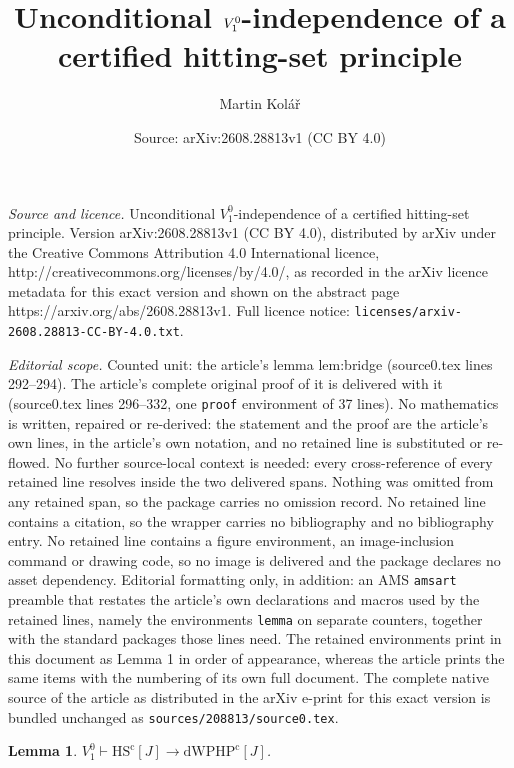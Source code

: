 \documentclass[10pt,a4paper]{amsart}
\title{Unconditional $\Vone$-independence of a certified hitting-set principle}
\author{Martin Kolář}
\date{Source: arXiv:2608.28813v1 (CC BY 4.0)}
\newtheorem{lemma}{Lemma}
\newcommand{\HScert}{\mathrm{HS}^{\mathrm{c}}}
\newcommand{\Vone}{V^0_1}
\newcommand{\dWPHPcert}{\mathrm{dWPHP}^{\mathrm{c}}}
\begin{document}
\maketitle

\noindent\emph{Source and licence.} Unconditional $\Vone$-independence of a certified hitting-set principle. Version arXiv:2608.28813v1 (CC BY 4.0), distributed by arXiv under the Creative Commons Attribution 4.0 International licence, http://creativecommons.org/licenses/by/4.0/, as recorded in the arXiv licence metadata for this exact version and shown on the abstract page https://arxiv.org/abs/2608.28813v1. Full licence notice: \texttt{licenses/arxiv-2608.28813-CC-BY-4.0.txt}.\par\smallskip

\noindent\textit{Editorial scope.} Counted unit: the article's lemma lem:bridge (source0.tex lines 292--294). The article's complete original proof of it is delivered with it (source0.tex lines 296--332, one \texttt{proof} environment of 37 lines). No mathematics is written, repaired or re-derived: the statement and the proof are the article's own lines, in the article's own notation, and no retained line is substituted or re-flowed.  No further source-local context is needed: every cross-reference of every retained line resolves inside the two delivered spans.  Nothing was omitted from any retained span, so the package carries no omission record.  No retained line contains a citation, so the wrapper carries no bibliography and no bibliography entry.  No retained line contains a figure environment, an image-inclusion command or drawing code, so no image is delivered and the package declares no asset dependency.  Editorial formatting only, in addition: an AMS \texttt{amsart} preamble that restates the article's own declarations and macros used by the retained lines, namely the environments \texttt{lemma} on separate counters, together with the standard packages those lines need.  The retained environments print in this document as Lemma 1 in order of appearance, whereas the article prints the same items with the numbering of its own full document.  The complete native source of the article as distributed in the arXiv e-print for this exact version is bundled unchanged as \texttt{sources/208813/source0.tex}.
\begin{lemma}\label{lem:bridge}
$\Vone\vdash\HScert[J]\to\dWPHPcert[J]$.
\end{lemma}
\end{document}
